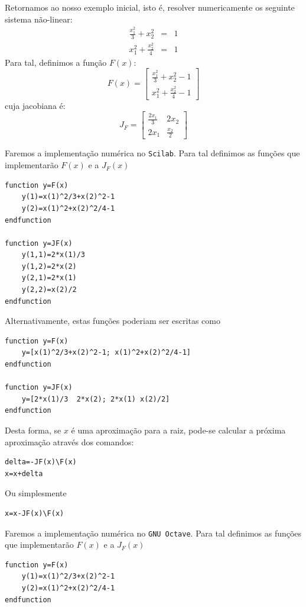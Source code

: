 \begin{ex} Retornamos ao nosso exemplo inicial, isto é, resolver numericamente os seguinte sistema não-linear:
\begin{eqnarray*}
\frac{x_1^2}{3}+x_2^2&=&1\\
x_1^2+\frac{x_2^2}{4}&=&1
\end{eqnarray*}
Para tal, definimos a função $F(x)$:
\begin{equation*}
  F(x)=\left[
\begin{array}{c}
\displaystyle \frac{x_1^2}{3}+x_2^2-1\\
\displaystyle x_1^2+\frac{x_2^2}{4}-1
\end{array}
\right]
\end{equation*}
cuja jacobiana é:
\begin{equation*}
  J_F=\left[\begin{array}{cc}
      \displaystyle \frac{2x_1}{3} & 2x_2\\
      \displaystyle 2x_1&\frac{x_2}{2}
    \end{array}\right]
\end{equation*}

\ifisscilab
Faremos a implementação numérica no \verb+Scilab+. Para tal definimos as funções que implementarão $F(x)$ e a $J_F(x)$
\begin{verbatim}
function y=F(x)
    y(1)=x(1)^2/3+x(2)^2-1
    y(2)=x(1)^2+x(2)^2/4-1
endfunction

function y=JF(x)
    y(1,1)=2*x(1)/3
    y(1,2)=2*x(2)
    y(2,1)=2*x(1)
    y(2,2)=x(2)/2
endfunction
\end{verbatim}
Alternativamente, estas funções poderiam ser escritas como
\begin{verbatim}
function y=F(x)
    y=[x(1)^2/3+x(2)^2-1; x(1)^2+x(2)^2/4-1]
endfunction

function y=JF(x)
    y=[2*x(1)/3  2*x(2); 2*x(1) x(2)/2]
endfunction
\end{verbatim}
Desta forma, se $x$ é uma aproximação para a raiz, pode-se calcular a próxima aproximação através dos comandos:
\begin{verbatim}
delta=-JF(x)\F(x)
x=x+delta
\end{verbatim}
Ou simplesmente
\begin{verbatim}
x=x-JF(x)\F(x)
\end{verbatim}
\fi
\ifisoctave
Faremos a implementação numérica no \verb+GNU Octave+. Para tal definimos as funções que implementarão $F(x)$ e a $J_F(x)$
\begin{verbatim}
function y=F(x)
    y(1)=x(1)^2/3+x(2)^2-1
    y(2)=x(1)^2+x(2)^2/4-1
endfunction


\end{verbatim}
\end{ex}
